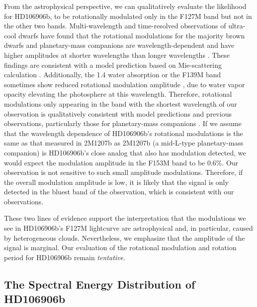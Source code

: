 \documentclass[twocolumn, trackchanges]{aastex62}
\begin{document}
From the astrophysical perspective, we can qualitatively evaluate the likelihood for HD106906b,  to be rotationally modulated only in the F127M band but not in the other two bands. Multi-wavelength and time-resolved observations of ultra-cool dwarfs have found that the rotational modulations for the majority  brown dwarfs and planetary-mass companions are wavelength-dependent and have higher amplitudes at shorter wavelengths than longer wavelengths \citep[e.g.,][]{Apai2013,Yang2015,Zhou2016,Schlawin2017,Zhou2019}. These {findings} are consistent with a model prediction based on Mie-scattering calculation \citep{Hiranaka2016, Lew2016,Schlawin2017}. Additionally, the 1.4 \micron{} water absorption or the F139M band sometimes show reduced rotational modulation amplitude \citep[e.g.,][]{Apai2013}, due to water vapor opacity elevating the photosphere at this wavelength.  Therefore, rotational modulations only appearing in the band with the shortest wavelength of our observation is qualitatively consistent with model predictions and previous observations, particularly those for planetary-mass companions \citep{Zhou2016,Zhou2019}. If we assume that the wavelength dependence of HD106906b's rotational modulations is the same as that measured in 2M1207b \citep{Zhou2016} as 2M1207b (a mid-L-type planetary-mass companion) is HD106906b's close analog that also has modulation detected, we would expect the modulation amplitude in the F153M band to be 0.6\%. Our observation is not sensitive to such small amplitude modulations. Therefore, if the overall modulation amplitude is low, it is likely that the signal is only detected in the bluest band of the observation, which is consistent with our observations.

These two lines of evidence support the interpretation that the modulations we see in HD106906b's F127M lightcurve are astrophysical and, in particular, caused by heterogeneous clouds. Nevertheless, we emphasize that the amplitude of the signal is marginal. Our evaluation of the rotational modulation and rotation period for HD106906b remain \emph{tentative}.


\subsection{The Spectral Energy Distribution of  HD106906b}
\end{document}

